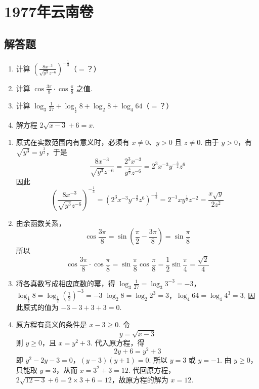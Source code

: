 \chapter{1977年云南卷}

\section{解答题}

\begin{problem}
\begin{enumerate}
\item 计算 \(\left(\frac{8x^{-3}}{\sqrt{y^3}z^{-6}}\right)^{-\frac{1}{3}}\)（\(=\)？）

\item 计算 \(\cos\frac{3\pi}{8}\cdot\cos\frac{\pi}{8}\) 之值.

\item 计算 \(\log_3\frac{1}{27}+\log_{\frac{1}{2}}8+\log_2 8+\log_4 64\)（\(=\)？）

\item 解方程 \(2\sqrt{x-3}+6=x\).
\end{enumerate}
\end{problem}

\begin{solution}
\begin{enumerate}
\item 原式在实数范围内有意义时，必须有 \(x\neq0\)、\(y>0\) 且 \(z\neq0\). 由于 \(y>0\)，有 \(\sqrt{y^3}=y^{\frac{3}{2}}\)，于是
\[
\frac{8x^{-3}}{\sqrt{y^3}z^{-6}}
=\frac{2^3x^{-3}}{y^{\frac{3}{2}}z^{-6}}
=2^3x^{-3}y^{-\frac{3}{2}}z^6
\]
因此
\[
\left(\frac{8x^{-3}}{\sqrt{y^3}z^{-6}}\right)^{-\frac{1}{3}}
=\left(2^3x^{-3}y^{-\frac{3}{2}}z^6\right)^{-\frac{1}{3}}
=2^{-1}xy^{\frac{1}{2}}z^{-2}
=\frac{x\sqrt{y}}{2z^2}
\]

\item 由余函数关系，
\[
\cos\frac{3\pi}{8}
=\sin\left(\frac{\pi}{2}-\frac{3\pi}{8}\right)
=\sin\frac{\pi}{8}
\]
所以
\[
\cos\frac{3\pi}{8}\cdot\cos\frac{\pi}{8}
=\sin\frac{\pi}{8}\cos\frac{\pi}{8}
=\frac{1}{2}\sin\frac{\pi}{4}
=\frac{\sqrt{2}}{4}
\]

\item 将各真数写成相应底数的幂，得
\(\log_3\frac{1}{27}=\log_3 3^{-3}=-3\)，\(\log_{\frac{1}{2}}8=\log_{\frac{1}{2}}\left(\frac{1}{2}\right)^{-3}=-3\)
\(\log_2 8=\log_2 2^3=3\)，\(\log_4 64=\log_4 4^3=3\).
因此原式的值为 \(-3-3+3+3=0\).

\item 原方程有意义的条件是 \(x-3\geqslant0\). 令
\[
y=\sqrt{x-3}
\]
则 \(y\geqslant0\)，且 \(x=y^2+3\). 代入原方程，得
\[
2y+6=y^2+3
\]
即
\(y^2-2y-3=0\)，\(\left(y-3\right)\left(y+1\right)=0\).
所以 \(y=3\) 或 \(y=-1\). 由 \(y\geqslant0\)，只能取 \(y=3\)，从而 \(x=3^2+3=12\). 代回原方程，\(2\sqrt{12-3}+6=2\times3+6=12\)，故原方程的解为 \(x=12\).
\end{enumerate}
\end{solution}

